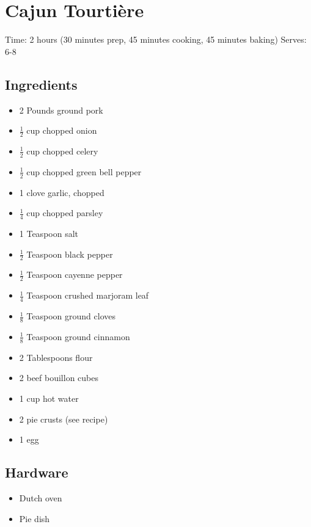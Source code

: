 \section{Cajun Tourtière}
\label{cajunTourtiere}
\setcounter{secnumdepth}{0}
Time: 2 hours (30 minutes prep, 45 minutes cooking, 45 minutes baking)
Serves: 6-8

\begin{multicols}{2}
\subsection*{Ingredients}
\begin{itemize}
    \item 2 Pounds ground pork
    \item \( \frac{1}{2} \) cup chopped onion
    \item \( \frac{1}{2} \) cup chopped celery
    \item \( \frac{1}{2} \) cup chopped green bell pepper
    \item 1 clove garlic, chopped
    \item \( \frac{1}{4} \) cup chopped parsley
    \item 1 Teaspoon salt
    \item \( \frac{1}{2} \) Teaspoon black pepper
    \item \( \frac{1}{2} \) Teaspoon cayenne pepper
    \item \( \frac{1}{4} \) Teaspoon crushed marjoram leaf
    \item \( \frac{1}{8} \) Teaspoon ground cloves
    \item \( \frac{1}{8} \) Teaspoon ground cinnamon
    \item 2 Tablespoons flour
    \item 2 beef bouillon cubes
    \item 1 cup hot water
    \item 2 pie crusts (see  recipe)
    \item 1 egg
\end{itemize}

\subsection*{Hardware}
\begin{itemize}
    \item Dutch oven
    \item Pie dish
\end{itemize}
\clearpage


\end{multicols}
